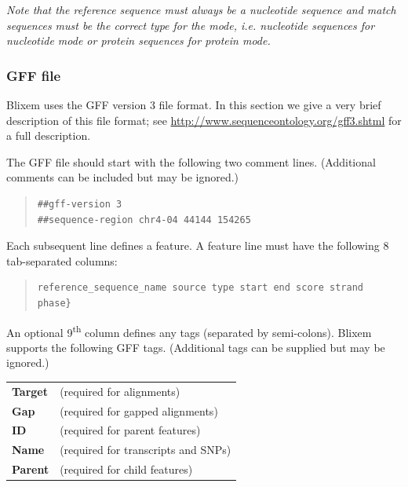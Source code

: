\documentclass[letterpaper]{article}
\begin{document}
\bigskip

{\itshape
Note that the reference sequence must always be a nucleotide sequence
and match sequences must be the correct type for the mode, i.e.
nucleotide sequences for nucleotide mode or protein sequences for
protein mode.}

{\color[rgb]{0.30980393,0.5058824,0.7411765}\subsubsection[GFF file]{GFF file}}
\hypertarget{RefHeading1521056909880}{}{
Blixem uses the GFF version 3 file format. In this section we give a
very brief description of this file format; see
\url{http://www.sequenceontology.org/gff3.shtml} for a full
description.}

\bigskip

{The GFF file should start with the following two comment lines.
(Additional comments can be included but may be ignored.)

\bigskip

\begin{quote}
\begin{verbatim}
##gff-version 3
##sequence-region chr4-04 44144 154265
\end{verbatim}
\end{quote}
Each subsequent line defines a feature. A feature line must have the
following 8 tab-separated columns:
\begin{quote}
\begin{verbatim}
reference_sequence_name source type start end score strand phase}
\end{verbatim}
\end{quote}
An optional 9\textsuperscript{th} column defines any tags (separated by
semi-colons). Blixem supports the following GFF tags. (Additional
tags can be supplied but may be ignored.)}
\begin{center}
\begin{supertabular}{p{2.802cm}p{10.704cm}} 
\textbf{Target } & (required for alignments) \\
\textbf{Gap}  & (required for gapped alignments) \\
\textbf{ID } & (required for parent features) \\
\textbf{Name } & (required for transcripts and SNPs) \\
\textbf{Parent } & (required for child features) \\
\end{supertabular}
\end{center}
\end{document}
